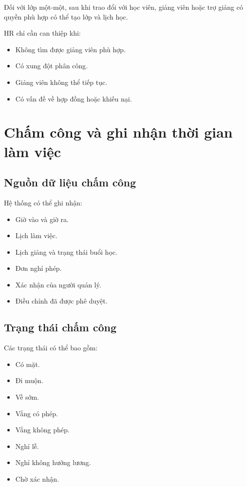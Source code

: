 \documentclass[12pt,a4paper]{article}
\begin{document}
Đối với lớp một-một, sau khi trao đổi với học viên,
giảng viên hoặc trợ giảng có quyền phù hợp có thể tạo lớp và lịch học.

HR chỉ cần can thiệp khi:

\begin{itemize}
    \item Không tìm được giảng viên phù hợp.
    \item Có xung đột phân công.
    \item Giảng viên không thể tiếp tục.
    \item Có vấn đề về hợp đồng hoặc khiếu nại.
\end{itemize}

\section{Chấm công và ghi nhận thời gian làm việc}

\subsection{Nguồn dữ liệu chấm công}

Hệ thống có thể ghi nhận:

\begin{itemize}
    \item Giờ vào và giờ ra.
    \item Lịch làm việc.
    \item Lịch giảng và trạng thái buổi học.
    \item Đơn nghỉ phép.
    \item Xác nhận của người quản lý.
    \item Điều chỉnh đã được phê duyệt.
\end{itemize}

\subsection{Trạng thái chấm công}

Các trạng thái có thể bao gồm:

\begin{itemize}
    \item Có mặt.
    \item Đi muộn.
    \item Về sớm.
    \item Vắng có phép.
    \item Vắng không phép.
    \item Nghỉ lễ.
    \item Nghỉ không hưởng lương.
    \item Chờ xác nhận.
\end{itemize}
\end{document}
